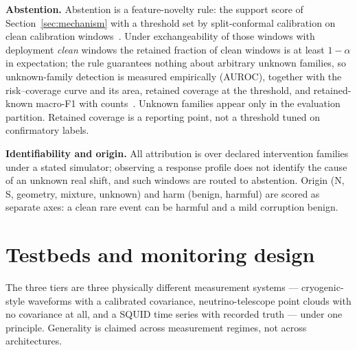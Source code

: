 \documentclass[10pt,twocolumn]{extarticle}
\begin{document}
\textbf{Abstention.} Abstention is a feature-novelty rule: the support score
of Section~\ref{sec:mechanism} with a threshold set by split-conformal
calibration on clean calibration windows~\cite{angelopoulos2021}. Under
exchangeability of those windows with deployment \emph{clean} windows the
retained fraction of clean windows is at least $1-\alpha$ in expectation; the
rule guarantees nothing about arbitrary unknown families, so unknown-family
detection is measured empirically (AUROC), together with the risk--coverage
curve and its area, retained coverage at the threshold, and retained-known
macro-F1 with counts~\cite{geifman2017}. Unknown families appear only in the
evaluation partition. Retained coverage is a reporting point, not a threshold
tuned on confirmatory labels.

\textbf{Identifiability and origin.} All attribution is over declared
intervention families under a stated simulator; observing a response profile
does not identify the cause of an unknown real shift, and such windows are
routed to abstention. Origin (N, S, geometry, mixture, unknown) and harm
(benign, harmful) are scored as separate axes: a clean rare event can be
harmful and a mild corruption benign.

\section{Testbeds and monitoring design}
\label{sec:testbeds}

The three tiers are three physically different measurement systems ---
cryogenic-style waveforms with a calibrated covariance, neutrino-telescope
point clouds with no covariance at all, and a SQUID time series with recorded
truth --- under one principle. Generality is claimed across measurement
regimes, not across architectures.
\end{document}
